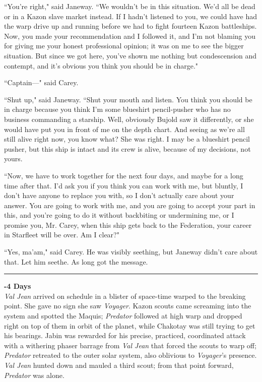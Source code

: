 \documentclass[twoside,letterpaper,12pt]{memoir}
\begin{document}
``You're right," said Janeway. ``We wouldn't be in this situation. We'd all be dead or in a Kazon slave market instead. If I hadn't listened to you, we could have had the warp drive up and running before we had to fight fourteen Kazon battleships. Now, you made your recommendation and I followed it, and I'm not blaming you for giving me your honest professional opinion; it was on me to see the bigger situation. But since we got here, you've shown me nothing but condescension and contempt, and it's obvious you think you should be in charge." 

``Captain---" said Carey. 

``Shut up," said Janeway. ``Shut your mouth and listen. You think you should be in charge because you think I'm some blueshirt pencil-pusher who has no business commanding a starship. Well, obviously Bujold saw it differently, or she would have put you in front of me on the depth chart. And seeing as we're all still alive right now, you know what? She was right. I may be a blueshirt pencil pusher, but this ship is intact and its crew is alive, because of my decisions, not yours. 

``Now, we have to work together for the next four days, and maybe for a long time after that. I'd ask you if you think you can work with me, but bluntly, I don't have anyone to replace you with, so I don't actually care about your answer. You are going to work with me, and you are going to accept your part in this, and you're going to do it without backbiting or undermining me, or I promise you, Mr. Carey, when this ship gets back to the Federation, your career in Starfleet will be over. Am I clear?" 

``Yes, ma'am," said Carey. He was visibly seething, but Janeway didn't care about that. Let him seethe. As long got the message.

\begin{center}\rule{3cm}{0.4 pt}\end{center} 

\noindent\textbf{-4 Days}\\

\textit{Val Jean} arrived on schedule in a blister of space-time warped to the breaking point. She gave no sign she saw \textit{Voyager}. Kazon scouts came screaming into the system and spotted the Maquis; \textit{Predator} followed at high warp and dropped right on top of them in orbit of the planet, while Chakotay was still trying to get his bearings. Jabin was rewarded for his precise, practiced, coordinated attack with a withering phaser barrage from \textit{Val Jean} that forced the scouts to warp off; \textit{Predator} retreated to the outer solar system, also oblivious to \textit{Voyager}'s presence. \textit{Val Jean} hunted down and mauled a third scout; from that point forward, \textit{Predator} was alone. 
\end{document}
